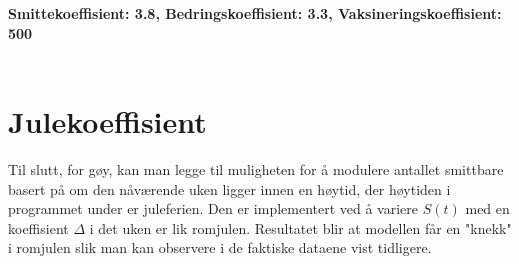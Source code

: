 \documentclass[12pt]{article}
\begin{document}
\begin{center}
    \large{\textbf{Smittekoeffisient: 3.8, Bedringskoeffisient: 3.3, Vaksineringskoeffisient: 500}}\\
    \hphantom{---------}\\
    \hphantom{---------}
\end{center}

\section{Julekoeffisient}
Til slutt, for gøy, kan man legge til muligheten for å modulere antallet smittbare basert på om den nåværende uken ligger 
innen en høytid, der høytiden i programmet under er juleferien. Den er implementert ved å variere $S(t)$ med en koeffisient 
$\Delta$ i det uken er lik romjulen. Resultatet blir at modellen får en "knekk" i romjulen slik man kan observere i de faktiske 
dataene vist tidligere.
\end{document}
